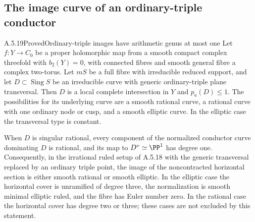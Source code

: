 \subsection{The image curve of an ordinary-triple conductor}

\begin{statement}{A.5.19}{Proved}{Ordinary-triple images have arithmetic genus at most one}
Let $f:Y\to C_0$ be a proper holomorphic map from a smooth
compact complex threefold with $b_2(Y)=0$, with connected
fibres and smooth general fibre a complex two-torus.
Let $mS$ be a full fibre with irreducible reduced support,
and let $D\subset\operatorname{Sing}S$ be an irreducible
curve with generic ordinary-triple plane transversal.
Then $D$ is a local complete intersection in $Y$ and
$p_a(D)\le1$. The possibilities for its underlying curve
are a smooth rational curve, a rational curve with one
ordinary node or cusp, and a smooth elliptic curve.
In the elliptic case the transversal type is constant.

When $D$ is singular rational, every component of the
normalized conductor curve dominating $D$ is rational,
and its map to $D^\nu\simeq\PP^1$ has degree one.
Consequently, in the irrational ruled setup of A.5.18
with the generic transversal replaced by an ordinary
triple point, the image of the noncontracted horizontal
section is either smooth rational or smooth elliptic.
In the elliptic case the horizontal cover is unramified
of degree three, the normalization is smooth minimal
elliptic ruled, and the fibre has Euler number zero.
In the rational case the horizontal cover has degree
two or three; these cases are not excluded by this
statement.
\end{statement}
